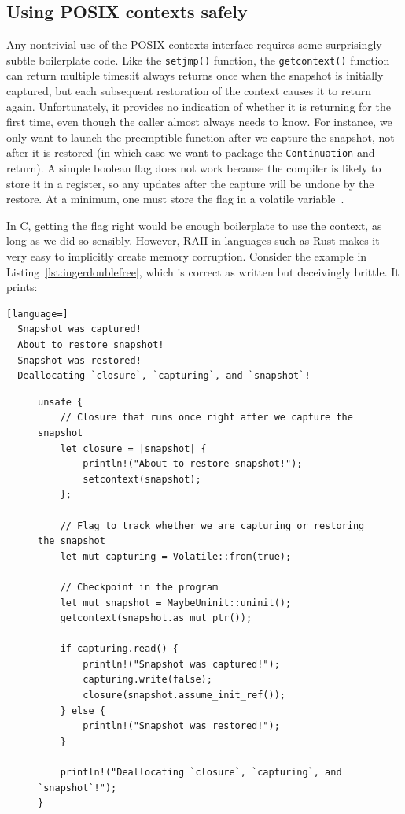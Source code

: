 \subsection{Using POSIX contexts safely}
\label{sec:libinger:boilerplate}

Any nontrivial use of the POSIX contexts interface requires some surprisingly-subtle
boilerplate code.  Like the \texttt{setjmp()} function, the
\texttt{getcontext()} function can return multiple times:\@ it always returns once
when the snapshot is initially captured, but each subsequent restoration of the
context causes it to return again.  Unfortunately, it provides no indication of
whether it is returning for the first time, even though the caller almost always
needs to know.  For instance, we only want to launch the preemptible function after
we capture the snapshot, not after it is restored (in which case we want to package
the \texttt{Continuation} and return).  A simple boolean flag does not work because
the compiler is likely to store it in a register, so any updates after the capture
will be undone by the restore.  At a minimum, one must store the flag in a volatile
variable~\cite{getcontext-manpage}.

In C, getting the flag right would be enough boilerplate to use the context, as long
as we did so sensibly.  However, RAII in languages such as Rust makes it very easy to
implicitly create memory corruption.  Consider the example in
Listing~\ref{lst:ingerdoublefree}, which is correct as written but deceivingly
brittle.  It prints:
\begin{lstlisting}[language=]
  Snapshot was captured!
  About to restore snapshot!
  Snapshot was restored!
  Deallocating `closure`, `capturing`, and `snapshot`!
\end{lstlisting}

\begin{figure}
\begin{lstlisting}[label=lst:ingerdoublefree,caption=Subtly unsound use of POSIX contexts from Rust,morekeywords={let,mut,unsafe}]
unsafe {
	// Closure that runs once right after we capture the snapshot
	let closure = |snapshot| {
		println!("About to restore snapshot!");
		setcontext(snapshot);
	};

	// Flag to track whether we are capturing or restoring the snapshot
	let mut capturing = Volatile::from(true);

	// Checkpoint in the program
	let mut snapshot = MaybeUninit::uninit();
	getcontext(snapshot.as_mut_ptr());

	if capturing.read() {
		println!("Snapshot was captured!");
		capturing.write(false);
		closure(snapshot.assume_init_ref());
	} else {
		println!("Snapshot was restored!");
	}

	println!("Deallocating `closure`, `capturing`, and `snapshot`!");
}
\end{lstlisting}
\end{figure}

